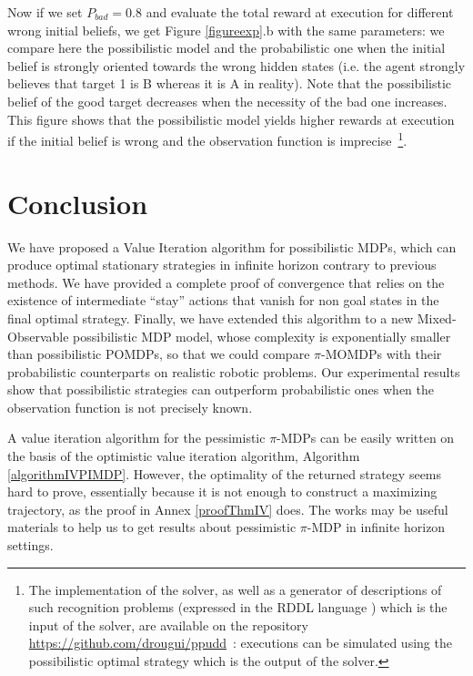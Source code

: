 Now if we set $P_{bad}=0.8$ 
and evaluate the total reward 
at execution for different 
wrong initial beliefs, 
we get Figure \ref{figureexp}.b 
with the same parameters: 
we compare here the possibilistic model 
and the probabilistic one 
when the initial belief 
is strongly oriented 
towards the wrong hidden states 
(i.e. the agent strongly 
believes that target 1 is B 
whereas it is A in reality). 
Note that the possibilistic belief 
of the good target 
decreases when the necessity of the
bad one increases. 
This figure shows that the possibilistic model 
yields higher rewards at execution 
if the initial belief is wrong 
and the observation function is imprecise~\footnote{
The implementation of the solver,
as well as a generator of descriptions of such recognition problems
(expressed in the RDDL language \cite{Sanner_relationaldynamic}) 
which is the input of the solver,
are available on the repository \url{https://github.com/drougui/ppudd}~:
executions can be simulated using the possibilistic optimal strategy
which is the output of the solver.}.

\section{Conclusion}
We have proposed a Value Iteration algorithm for possibilistic MDPs, which
can produce optimal stationary strategies in infinite horizon contrary to previous
methods. We have provided a complete proof of convergence that relies on the
existence of intermediate ``stay'' actions that vanish 
for non goal states in the final optimal strategy. 
Finally, we have extended this algorithm to a new Mixed-Observable
possibilistic MDP model, whose complexity is exponentially smaller than
possibilistic POMDPs, so that we could compare $\pi$-MOMDPs with their
probabilistic counterparts on realistic robotic problems. Our experimental
results show that possibilistic strategies can outperform probabilistic 
ones when the observation function is not precisely known.

A value iteration algorithm for the pessimistic $\pi$-MDPs 
can be easily written on the basis of the optimistic value iteration algorithm,
Algorithm \ref{algorithmIVPIMDP}.
However, the optimality of the returned strategy seems 
hard to prove, essentially because it is not enough 
to construct a maximizing trajectory, 
as the proof in Annex \ref{proofThmIV} does. 
The works \cite{LIP61498,DBLP:books/daglib/0024909} 
may be useful materials to help us to get results about pessimistic 
$\pi$-MDP in infinite horizon settings.

